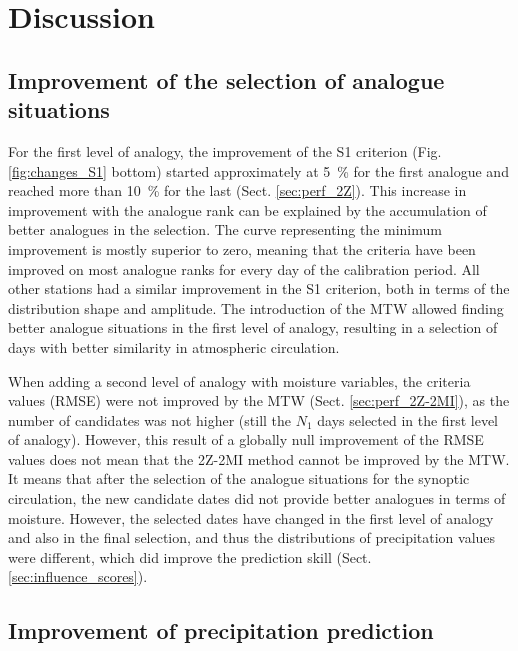 \documentclass[hess, manuscript]{copernicus}
\begin{document}
	
	\section{Discussion}
	\label{sec:discussion}
	
	
	\subsection{Improvement of the selection of analogue situations}
	
	For the first level of analogy, the improvement of the S1 criterion (Fig. \ref{fig:changes_S1} bottom) started approximately at 5~\% for the first analogue and reached more than 10~\% for the last (Sect. \ref{sec:perf_2Z}). This increase in improvement with the analogue rank can be explained by the accumulation of better analogues in the selection. The curve representing the minimum improvement is mostly superior to zero, meaning that the criteria have been improved on most analogue ranks for every day of the calibration period. All other stations had a similar improvement in the S1 criterion, both in terms of the distribution shape and amplitude. The introduction of the MTW allowed finding better analogue situations in the first level of analogy, resulting in a selection of days with better similarity in atmospheric circulation.
	
	When adding a second level of analogy with moisture variables, the criteria values (RMSE) were not improved by the MTW (Sect. \ref{sec:perf_2Z-2MI}), as the number of candidates was not higher (still the $N_{1}$ days selected in the first level of analogy). However, this result of a globally null improvement of the RMSE values does not mean that the 2Z-2MI method cannot be improved by the MTW. It means that after the selection of the analogue situations for the synoptic circulation, the new candidate dates did not provide better analogues in terms of moisture. However, the selected dates have changed in the first level of analogy and also in the final selection, and thus the distributions of precipitation values were different, which did improve the prediction skill (Sect. \ref{sec:influence_scores}).
	
	
	\subsection{Improvement of precipitation prediction}
	
\end{document}
